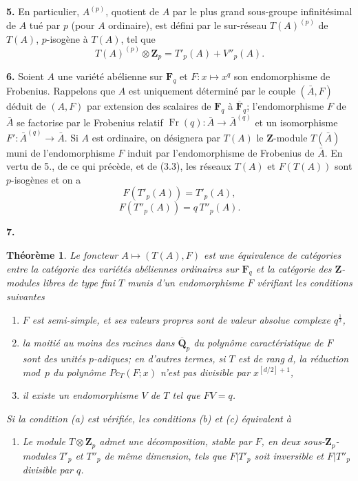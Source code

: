 \documentclass[10pt]{amsart}
\theoremstyle{plain}
\newtheorem{theorem}{Th\'eor\`eme}
\theoremstyle{remark}
\DeclareMathOperator{\Fr}{Fr}
\begin{document}
\smallskip
\textbf{5.} En particulier, $A^{(p)}$, quotient de $A$ par le plus
grand sous-groupe infinit\'esimal de $A$ tu\'e par $p$ (pour $A$
ordinaire), est d\'efini par le sur-r\'eseau $T(A)^{(p)}$ de $T(A)$,
$p$-isog\`ene \`a $T(A)$, tel que
\[
T(A)^{(p)} \otimes \mathbf{Z}_p = T'_p(A) + V''_p(A).
\]

\smallskip
\textbf{6.} Soient $A$ une vari\'et\'e ab\'elienne sur $\mathbf{F}_q$
et $F\colon x \mapsto x^q$ son endomorphisme de Frobenius. Rappelons
que $A$ est uniquement d\'etermin\'e par le couple $(\bar{A}, F)$
d\'eduit de $(A, F)$ par extension des scalaires de $\mathbf{F}_q$ \`a
$\overline{\mathbf{F}}_q$; l'endomorphisme $F$ de $\bar{A}$ se factorise
par le Frobenius relatif $\Fr(q)\colon \bar{A} \to \bar{A}^{(q)}$ et un
isomorphisme $F'\colon \bar{A}^{(q)} \to \bar{A}$. Si $A$ est ordinaire,
on d\'esignera par $T(A)$ le $\mathbf{Z}$-module $T(\bar{A})$ muni de
l'endomorphisme $F$ induit par l'endomorphisme de Frobenius de
$\bar{A}$. En vertu de 5., de ce qui pr\'ec\`ede, et de (3.3), les
r\'eseaux $T(A)$ et $F(T(A))$ sont $p$-isog\`enes et on a
\begin{equation}
F(T'_p(A)) = T'_p(A), \tag{6.1}
\end{equation}
\begin{equation}
F(T''_p(A)) = q\,T''_p(A). \tag{6.2}
\end{equation}

\smallskip
\textbf{7.}
\begin{theorem}
Le foncteur $A \mapsto (T(A), F)$ est une \'equivalence de cat\'egories
entre la cat\'egorie des vari\'et\'es ab\'eliennes ordinaires sur
$\mathbf{F}_q$ et la cat\'egorie des $\mathbf{Z}$-modules libres de type
fini $T$ munis d'un endomorphisme $F$ v\'erifiant les conditions
suivantes
\begin{enumerate}
\item[(a)] $F$ est semi-simple, et ses valeurs propres sont de valeur
absolue complexe $q^{\frac{1}{2}}$,
\item[(b)] la moiti\'e au moins des racines dans $\overline{\mathbf{Q}}_p$
du polyn\^ome caract\'eristique de $F$ sont des unit\'es $p$-adiques;
en d'autres termes, si $T$ est de rang $d$, la r\'eduction mod~$p$
du polyn\^ome $Pc_T(F;x)$ n'est pas divisible par
$x^{[d/2]+1}$,
\item[(c)] il existe un endomorphisme $V$ de $T$ tel que $FV = q$.
\end{enumerate}
Si la condition (a) est v\'erifi\'ee, les conditions (b) et (c)
\'equivalent \`a
\begin{enumerate}
\item[(d)] Le module $T \otimes \mathbf{Z}_p$ admet une d\'ecomposition,
stable par $F$, en deux sous-$\mathbf{Z}_p$-modules $T'_p$ et $T''_p$
de m\^eme dimension, tels que $F|T'_p$ soit inversible et $F|T''_p$
divisible par $q$.
\end{enumerate}
\end{theorem}
\end{document}
